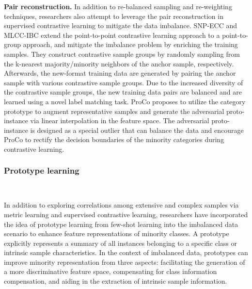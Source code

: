  
\textbf{Pair reconstruction.} 
In addition to re-balanced sampling and re-weighting techniques, researchers also attempt to leverage the {pair reconstruction} in supervised contrastive learning to mitigate the data imbalance.
SNP-ECC \cite{gao2022ensemble} and MLCC-IBC \cite{gao2023imbalanced} extend the point-to-point contrastive learning approach to a point-to-group approach, and mitigate the imbalance problem by enriching the training samples. They construct contrastive sample groups by randomly sampling from the k-nearest majority/minority neighbors of the anchor sample, respectively. Afterwards, the new-format training data are generated by pairing the anchor sample with various contrastive sample groups. Due to the increased diversity of the contrastive sample groups, the new training data pairs are balanced and are learned using a novel label matching task.
ProCo \cite{yang2022proco} proposes to utilize the category prototype to augment representative samples and generate the adversarial proto-instance via linear interpolation in the feature space. The adversarial proto-instance is designed as a special outlier that can balance the data and encourage ProCo to rectify the decision boundaries of the minority categories during contrastive learning.



\subsubsection{Prototype learning}\
\label{s324}

In addition to exploring correlations among extensive and complex samples via metric learning and supervised contrastive learning, researchers have incorporated the idea of prototype learning \cite{snell2017prototypical} from few-shot learning into the imbalanced data scenario to enhance feature representations of minority classes.
A prototype explicitly represents a summary of all instances belonging to a specific class or intrinsic sample characteristics. In the context of imbalanced data, prototypes can improve minority representation from three aspects: {facilitating the generation of a more discriminative feature space}, {compensating for class information compensation}, and {aiding in the extraction of intrinsic sample information}.


